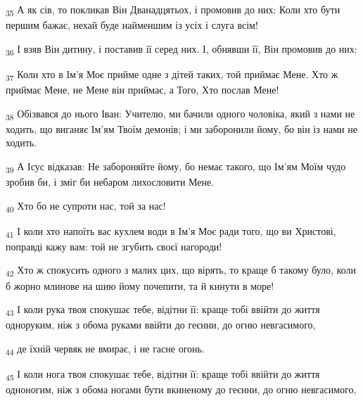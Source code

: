 \begin{tcolorbox}
\textsubscript{35} А як сів, то покликав Він Дванадцятьох, і промовив до них: Коли хто бути першим бажає, нехай буде найменшим із усіх і слуга всім!
\end{tcolorbox}
\begin{tcolorbox}
\textsubscript{36} І взяв Він дитину, і поставив її серед них. І, обнявши її, Він промовив до них:
\end{tcolorbox}
\begin{tcolorbox}
\textsubscript{37} Коли хто в Ім'я Моє прийме одне з дітей таких, той приймає Мене. Хто ж приймає Мене, не Мене він приймає, а Того, Хто послав Мене!
\end{tcolorbox}
\begin{tcolorbox}
\textsubscript{38} Обізвався до нього Іван: Учителю, ми бачили одного чоловіка, який з нами не ходить, що виганяє Ім'ям Твоїм демонів; і ми заборонили йому, бо він із нами не ходить.
\end{tcolorbox}
\begin{tcolorbox}
\textsubscript{39} А Ісус відказав: Не забороняйте йому, бо немає такого, що Ім'ям Моїм чудо зробив би, і зміг би небаром лихословити Мене.
\end{tcolorbox}
\begin{tcolorbox}
\textsubscript{40} Хто бо не супроти нас, той за нас!
\end{tcolorbox}
\begin{tcolorbox}
\textsubscript{41} І коли хто напоїть вас кухлем води в Ім'я Моє ради того, що ви Христові, поправді кажу вам: той не згубить своєї нагороди!
\end{tcolorbox}
\begin{tcolorbox}
\textsubscript{42} Хто ж спокусить одного з малих цих, що вірять, то краще б такому було, коли б жорно млинове на шию йому почепити, та й кинути в море!
\end{tcolorbox}
\begin{tcolorbox}
\textsubscript{43} І коли рука твоя спокушає тебе, відітни її: краще тобі ввійти до життя одноруким, ніж з обома руками ввійти до геєнни, до огню невгасимого,
\end{tcolorbox}
\begin{tcolorbox}
\textsubscript{44} де їхній червяк не вмирає, і не гасне огонь.
\end{tcolorbox}
\begin{tcolorbox}
\textsubscript{45} І коли нога твоя спокушає тебе, відітни її: краще тобі ввійти до життя одноногим, ніж з обома ногами бути вкиненому до геєнни, до огню невгасимого,
\end{tcolorbox}
